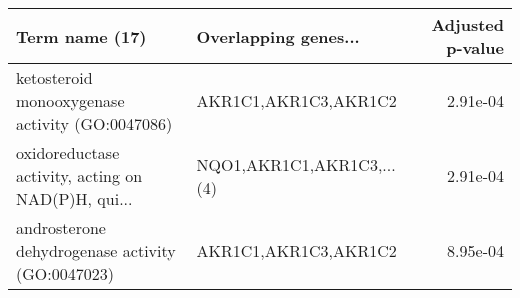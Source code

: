 \begin{tabular}{llr}
\toprule
                                    Term name (17) &      Overlapping genes... &  Adjusted p-value \\
\midrule
   ketosteroid monooxygenase activity (GO:0047086) &      AKR1C1,AKR1C3,AKR1C2 &          2.91e-04 \\
oxidoreductase activity, acting on NAD(P)H, qui... & NQO1,AKR1C1,AKR1C3,...(4) &          2.91e-04 \\
  androsterone dehydrogenase activity (GO:0047023) &      AKR1C1,AKR1C3,AKR1C2 &          8.95e-04 \\
\bottomrule
\end{tabular}
